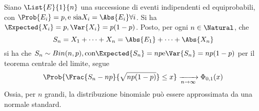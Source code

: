 \documentclass{subfiles}
\begin{document}
\begin{Remark*}
    Siano \(\List{E}{1}{n}\) una successione di eventi indipendenti ed equiprobabili, con $\Prob{E_{i}} = p, \text{e sia} X_{i} = \Abs{E_{i}} \forall i$.
    Si ha $\Expected{X_{i}} = p, \Var{X_{i}} = p(1 - p)$.
    Posto, per ogni $n \in \Natural$, che
    $$
        S_{n} = X_{1} + \cdots + X_{n} = \Abs{E_{1}} + \cdots +\Abs{X_{n}}
    $$
    si ha che $S_{n} \sim Bin(n, p), \text{con} \Expected{S_{n}} = np \text{e} \Var{S_{n}} = np(1 - p)$
    per il teorema centrale del limite, segue
    $$
        \Prob{\Frac{S_{n} - np}{\sqrt{np(1-p)}} \le x} \xrightarrow[n \to \infty]{} \Phi_{0, 1}(x)
    $$
    Ossia, per $n$ grandi, la distribuzione binomiale può essere approssimata da una normale standard.
\end{Remark*}
\end{document}

